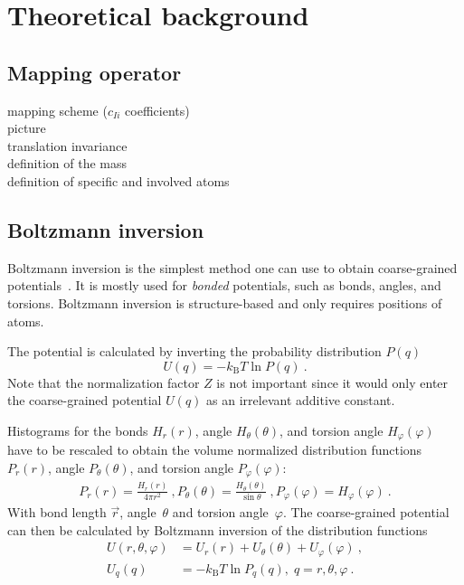 \chapter{Theoretical background}

\section{Mapping operator}
\sasha
mapping scheme ($c_{Ii}$ coefficients) \\
picture \\
translation invariance \\
definition of the mass \\
definition of specific and involved atoms \\

\section{Boltzmann inversion}
Boltzmann inversion is the simplest method one can use to obtain coarse-grained potentials~\cite{Tschoep:1998}. It is mostly used for {\em bonded} potentials, such as bonds, angles, and torsions. Boltzmann inversion is structure-based and only requires positions of atoms.

The potential is calculated by inverting the probability distribution $P(q)$ 
\begin{equation}
  U(q) = - k_\text{B} T \ln  P(q) ~.
  \label{eq:inv_boltzmann}
\end{equation}
%
Note that the normalization factor $Z$ is not important since it would only enter the coarse-grained potential $U(q)$ as an irrelevant additive constant.

Histograms for the bonds $H_r(r)$, angle $H_\theta(\theta)$, and torsion angle $H_\varphi(\varphi)$ have to be rescaled to obtain the volume normalized distribution functions $P_r(r)$, angle $P_\theta(\theta)$, and torsion angle $P_\varphi(\varphi)$: 
%
\begin{align}
    P_r(r) = \frac{H_r(r)}{4\pi r^2}~,
    P_\theta(\theta) = \frac{H_\theta(\theta)}{\sin \theta}~,
    P_\varphi(\varphi) = H_\varphi (\varphi)~.
    \label{eq:boltzmann_norm}
\end{align}
With bond length $\vec{r}$, angle~$\theta$ and torsion angle~$\varphi$.%
The coarse-grained potential can then be calculated by Boltzmann inversion of the distribution functions
%
\begin{align}
    \label{eq:boltzmann_pmf}
    U({r}, \theta, \varphi) &= U_r({r}) + U_{\theta}(\theta) + U_{\varphi}(\varphi)~, \\
    U_q({q}) &= - k_\text{B} T \ln P_q( q ),\; q=r, \theta, \varphi~.
    \nonumber
\end{align}

